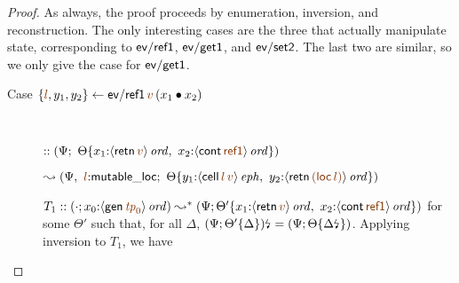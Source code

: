 \begin{proof}
As always, the proof proceeds by enumeration, inversion, and reconstruction. 
The only interesting cases are the three that actually manipulate state,
corresponding to ${\sf ev/ref1}$, ${\sf ev/get1}$, and ${\sf ev/set2}$.
The last two are similar, so we only give the case for ${\sf ev/get1}$.

\begin{description}
\item
  [Case $\trstep{\lf{l}, y_1, y_2}
         {{\sf ev/ref1}\,\lf{v}\,(\tfuser{x_1}{x_2})}$]~

\qquad 
  $:: \left(\Psi; ~ 
   \tackon{\Theta}{x_1{:}\istrue{\susp{{\sf retn}\,\lf{v}}}, ~
                   x_2{:}\istrue{\susp{{\sf cont}\,\lf{\sf ref1}}}}
   \right)$

\qquad\qquad
  $\leadsto \left(\Psi, ~ \lf{l}{:}{\sf mutable\_loc}; ~
   \tackon{\Theta}{y_1{:}\iseph{\susp{{\sf cell}\,\lf{l}\,\lf{v}}}, ~
                   y_2{:}\istrue{\susp{{\sf retn}\,\lf{({\sf loc}\,\lf{l})}}}}
   \right)$

   \medskip 
   $T_1 :: (\cdot; x_0{:}\istrue{\susp{{\sf gen}\,\lf{{\it tp}_0}}}) 
    \leadsto^* \left(\Psi;
     \tackon{\Theta'}{x_1{:}\istrue{\susp{{\sf retn}\,\lf{v}}}, ~
                   x_2{:}\istrue{\susp{{\sf cont}\,\lf{\sf ref1}}}}
     \right)$ for some $\Theta'$ such that, for all $\Delta$,
   ${(\Psi; {\Theta'}\{{\Delta}\})}{\mbox{\lightning}}_{} = (\Psi;
   {\Theta}\{{{\Delta}{\mbox{\lightning}}_{}}\})$. Applying 
   inversion to $T_1$, we have

   \medskip


\end{description}
\end{proof}
